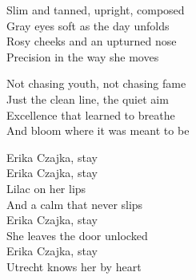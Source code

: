 \begin{lyrics}
Slim and tanned, upright, composed\\
Gray eyes soft as the day unfolds\\
Rosy cheeks and an upturned nose\\
Precision in the way she moves

Not chasing youth, not chasing fame\\
Just the clean line, the quiet aim\\
Excellence that learned to breathe\\
And bloom where it was meant to be

Erika Czajka, stay\\
Erika Czajka, stay\\
Lilac on her lips\\
And a calm that never slips\\
Erika Czajka, stay\\
She leaves the door unlocked\\
Erika Czajka, stay\\
Utrecht knows her by heart
\end{lyrics}

